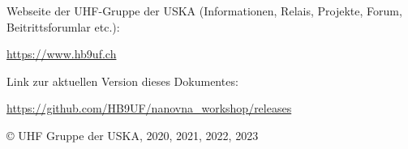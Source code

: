 \documentclass[twoside,a4paper,11pt,halfparskip,DIV=11,notitlepage]{scrartcl}
\begin{document}
\begin{titlepage}
\vfill
{}
\vfill
\clearpage
\vspace*{\fill}
\parbox{0.6\textwidth}{\scriptsize Webseite der UHF-Gruppe der USKA (Informationen, Relais, Projekte, Forum, Beitrittsforumlar etc.):\par
\url{https://www.hb9uf.ch}
}

\vspace{1cm}

\parbox{0.6\textwidth}{\scriptsize Link zur aktuellen Version dieses Dokumentes:\par
\url{https://github.com/HB9UF/nanovna_workshop/releases}
}

\vspace{1cm}

\scriptsize © UHF Gruppe der USKA, 2020, 2021, 2022, 2023
\end{titlepage}





\cleardoublepage

\maketitle

\setcounter{tocdepth}{1}
\tableofcontents



\newpage

\end{document}
